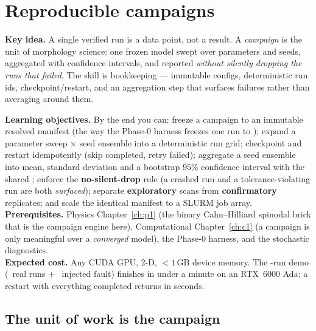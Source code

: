 \chapter{Reproducible campaigns}
\label{ch:c9}
\begin{keybox}
\textbf{Key idea.} A single verified run is a data point, not a result.
A \emph{campaign} is the unit of morphology science: one frozen model
swept over parameters and seeds, aggregated with confidence intervals,
and reported \emph{without silently dropping the runs that failed}. The
skill is bookkeeping --- immutable configs, deterministic run ids,
checkpoint/restart, and an aggregation step that surfaces failures
rather than averaging around them.
\end{keybox}

\begin{keybox}
\textbf{Learning objectives.} By the end you can: freeze a campaign to an
immutable resolved manifest (the way the Phase-0 harness freezes one run
to ); expand a parameter sweep $\times$ seed
ensemble into a deterministic run grid; checkpoint and restart
idempotently (skip completed, retry failed); aggregate a seed ensemble
into mean, standard deviation and a bootstrap $95\%$ confidence interval
with the shared ; enforce the
\textbf{no-silent-drop} rule (a crashed run and a tolerance-violating run
are both \emph{surfaced}); separate \textbf{exploratory} scans from
\textbf{confirmatory} replicates; and scale the identical manifest to a
SLURM job array.\\[2pt]
\textbf{Prerequisites.} Physics Chapter~\ref{ch:p1} (the binary
Cahn--Hilliard spinodal brick that is the campaign engine here),
Computational Chapter~\ref{ch:c1} (a campaign is only meaningful over a
\emph{converged} model), the Phase-0 harness, and the stochastic
diagnostics.\\[2pt]
\textbf{Expected cost.} Any CUDA GPU, 2-D, $<1$\,GB device memory. The
\CnineNruns-run demo (\CnineNcompleted\ real runs $+$ \CnineNinjected\
injected fault) finishes in under a minute on an RTX~6000 Ada; a restart
with everything completed returns in seconds.
\end{keybox}

\section{The unit of work is the campaign}

